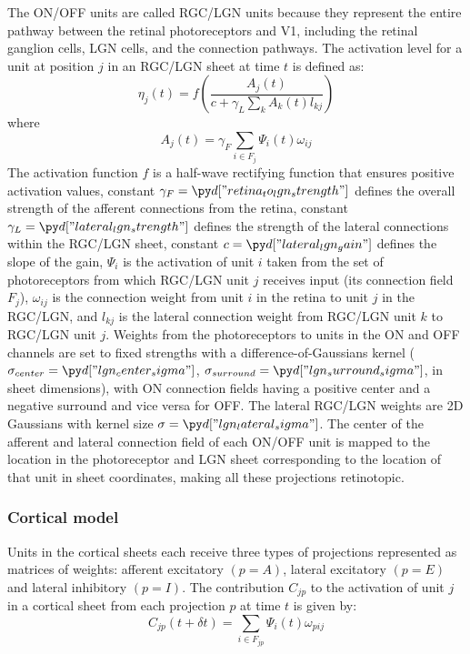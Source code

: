 \documentclass[utf8]{frontiersSCNS}
\begin{document}
The ON/OFF units are called RGC/LGN units because they represent the entire pathway between the retinal photoreceptors
and V1, including the retinal ganglion cells, LGN cells, and the connection pathways. The activation level for a unit at position $j$
in an RGC/LGN sheet at time $t$ is defined as:
\begin{equation}
\eta_{j}(t)=f\left(\frac{A_{j}(t)}{c + \gamma_{L}\sum_{k}A_{k}(t)l_{kj}}\right)
\end{equation}
\noindent where
\begin{equation}
A_{j}(t) = \gamma_{F}\sum_{i\in F_j}\Psi_{i}(t)\omega_{ij}
\end{equation}
The activation function $f$ is a half-wave rectifying function that ensures positive activation values, constant $\gamma_{F}=\insval{retina_to_lgn_strength}$ defines the overall strength of the afferent connections from the retina, constant $\gamma_{L}=\insval{lateral_lgn_strength}$ defines the strength of the lateral connections within the RGC/LGN sheet, constant $c=\insval{lateral_lgn_gain}$ defines the slope of the gain, $\Psi_{i}$ is the activation of unit $i$ taken from the set of photoreceptors
from which RGC/LGN unit $j$ receives input (its connection field $F_j$), $\omega_{ij}$ is the connection weight from unit $i$ in the
retina to unit $j$ in the RGC/LGN, and $l_{kj}$ is the lateral connection weight from RGC/LGN unit $k$ to RGC/LGN unit $j$.
Weights from the photoreceptors to units in the ON and OFF channels are set to fixed strengths with a difference-of-Gaussians
kernel ($\sigma_{center}=\insval{lgn_center_sigma}$, $\sigma_{surround}=\insval{lgn_surround_sigma}$, in sheet dimensions), with ON connection fields having a positive center and a negative surround and vice versa for OFF.  The lateral RGC/LGN weights are 2D Gaussians with kernel size $\sigma=\insval{lgn_lateral_sigma}$. The center of the afferent and lateral connection field of each ON/OFF unit is mapped to the location in the photoreceptor and LGN sheet corresponding to the location of that unit in sheet coordinates, making all these projections retinotopic.

\subsubsection{Cortical model}

Units in the cortical sheets each receive three types of projections represented as matrices of weights: afferent excitatory $(p=A)$, 
lateral excitatory $(p=E)$ and lateral inhibitory $(p=I)$.  The contribution $C_{jp}$ to the activation of unit $j$ in a cortical sheet from each projection $p$ at time $t$ is given by: 
\begin{equation} \label{eq:vm_model}
C_{jp}(t+\delta t)=\sum_{i\in F_{jp}}\Psi_{i}(t)\omega_{pij} 
\end{equation} 
\end{document}
